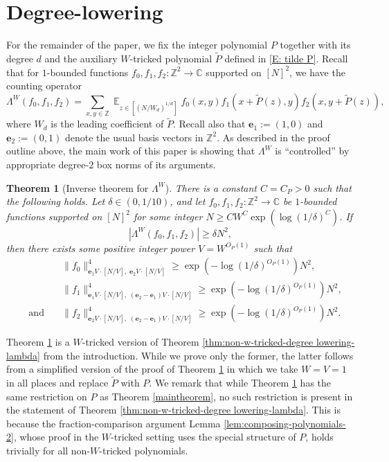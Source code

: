 \documentclass[11pt]{amsart}
\newtheorem{theorem}[lemma]{Theorem}
\theoremstyle{definition}
\DeclareMathOperator*{\E}{\mathbb{E}}
\newcommand{\Z}{{\mathbb Z}}
\newcommand{\be}{{\mathbf{e}}}
\begin{document}
\section{Degree-lowering}\label{S: degree lowering}
For the remainder of the paper, we fix the integer polynomial $P$ together with its degree $d$ and the auxiliary $W$-tricked polynomial $\widetilde{P}$ defined in \eqref{E: tilde P}.  Recall that for $1$-bounded functions $f_0,f_1,f_2: \Z^2 \to \mathbb{C}$ supported on $[N]^2$, we have the counting operator
$$\Lambda^W(f_0,f_1,f_2)=\sum_{x,y \in \mathbb{Z}} \E_{z \in [(N/W_d)^{1/d}]}f_0(x,y)f_1(x+\widetilde{P}(z),y)f_2(x,y+\widetilde{P}(z)),$$
where $W_d$ is the leading coefficient of $\widetilde P$.  Recall also that $\be_1:=(1,0)$ and $\be_2:=(0,1)$ denote the usual basis vectors in $\mathbb{Z}^2$. As described in the proof outline above, the main work of this paper is showing that $\Lambda^W$ is ``controlled'' by appropriate degree-$2$ box norms of its arguments.  
\begin{theorem}[{Inverse theorem for $\Lambda^W$}]\label{thm:degree lowering-lambda}
There is a constant $C=C_P>0$ such that the following holds.  Let $\delta\in(0, 1/10)$, and let $f_0, f_1, f_2: \Z^2 \to \mathbb{C}$ be $1$-bounded functions supported on $[N]^2$ for some integer $N  \geq C W^{C}\exp(\log(1/\delta)^{C})$.  If
$$|\Lambda^W(f_0,f_1,f_2)| \geq \delta N^2,$$
then 
there exists some positive integer power $V = W^{O_P(1)}$ such that
\begin{align*}
    &\|f_0\|_{\be_1V \cdot [N/V],\; \be_2V \cdot [N/V]}^4 \geq \exp(-\log(1/\delta)^{O_P(1)}) N^2,\\ 
    &\|f_1\|_{\be_1V \cdot [N/V],\; (\be_2-\be_1)V \cdot [N/V]}^4 \geq \exp(-\log(1/\delta)^{O_P(1)}) N^2,\\
    \quad \text{and} \quad &\|f_2\|_{\be_2V \cdot [N/V],\; (\be_2-\be_1)V \cdot [N/V]}^4 \geq \exp(-\log(1/\delta)^{O_P(1)}) N^2.
\end{align*}
\end{theorem}
Theorem \ref{thm:degree lowering-lambda} is a $W$-tricked version of Theorem \ref{thm:non-w-tricked-degree lowering-lambda} from the introduction. While we prove only the former, the latter follows from a simplified version of the proof of Theorem \ref{thm:degree lowering-lambda} in which we take $W=V=1$ in all places and replace $\widetilde{P}$ with $P$. We remark that while Theorem \ref{thm:degree lowering-lambda} has the same restriction on $P$ as Theorem \ref{maintheorem}, no such restriction is present in the statement of Theorem \ref{thm:non-w-tricked-degree lowering-lambda}. This is because the fraction-comparison argument Lemma \ref{lem:composing-polynomials-2}, whose proof in the $W$-tricked setting uses the special structure of ${P}$, holds trivially for all non-$W$-tricked polynomials.
\end{document}
